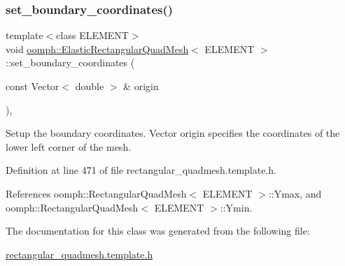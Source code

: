 \subsubsection{\texorpdfstring{set\+\_\+boundary\+\_\+coordinates()}{set\_boundary\_coordinates()}}
{\footnotesize\ttfamily template$<$class E\+L\+E\+M\+E\+NT$>$ \\
void \hyperlink{classoomph_1_1ElasticRectangularQuadMesh}{oomph\+::\+Elastic\+Rectangular\+Quad\+Mesh}$<$ E\+L\+E\+M\+E\+NT $>$\+::set\+\_\+boundary\+\_\+coordinates (\begin{DoxyParamCaption}\item[{const Vector$<$ double $>$ \&}]{origin }\end{DoxyParamCaption})\hspace{0.3cm}{\ttfamily [inline]}, {\ttfamily [private]}}



Setup the boundary coordinates. Vector origin specifies the coordinates of the lower left corner of the mesh. 



Definition at line 471 of file rectangular\+\_\+quadmesh.\+template.\+h.



References oomph\+::\+Rectangular\+Quad\+Mesh$<$ E\+L\+E\+M\+E\+N\+T $>$\+::\+Ymax, and oomph\+::\+Rectangular\+Quad\+Mesh$<$ E\+L\+E\+M\+E\+N\+T $>$\+::\+Ymin.



The documentation for this class was generated from the following file\+:\begin{DoxyCompactItemize}
\item 
\hyperlink{rectangular__quadmesh_8template_8h}{rectangular\+\_\+quadmesh.\+template.\+h}\end{DoxyCompactItemize}
